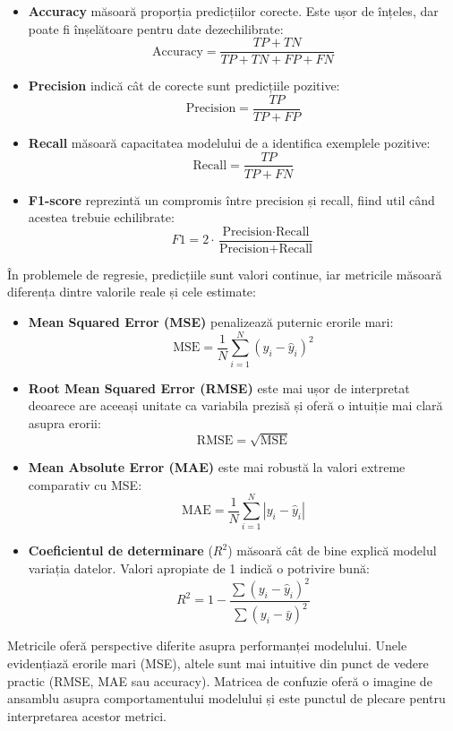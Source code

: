 \begin{itemize}
    \item \textbf{Accuracy} măsoară proporția predicțiilor corecte. Este ușor de înțeles, dar poate fi înșelătoare pentru date dezechilibrate:
    \[
        \text{Accuracy} = \frac{TP + TN}{TP + TN + FP + FN}
    \]

    \item \textbf{Precision} indică cât de corecte sunt predicțiile pozitive:
    \[
        \text{Precision} = \frac{TP}{TP + FP}
    \]

    \item \textbf{Recall} măsoară capacitatea modelului de a identifica exemplele pozitive:
    \[
        \text{Recall} = \frac{TP}{TP + FN}
    \]

    \item \textbf{F1-score} reprezintă un compromis între precision și recall, fiind util când acestea trebuie echilibrate:
    \[
        F1 = 2 \cdot \frac{\text{Precision} \cdot \text{Recall}}{\text{Precision} + \text{Recall}}
    \]
\end{itemize}

În problemele de regresie, predicțiile sunt valori continue, iar metricile măsoară diferența dintre valorile reale și cele estimate:

\begin{itemize}
    \item \textbf{Mean Squared Error (MSE)} penalizează puternic erorile mari:
    \[
        \text{MSE} = \frac{1}{N} \sum_{i=1}^{N} (y_i - \hat{y}_i)^2
    \]

    \item \textbf{Root Mean Squared Error (RMSE)} este mai ușor de interpretat deoarece are aceeași unitate ca variabila prezisă și oferă o intuiție mai clară asupra erorii:
    \[
        \text{RMSE} = \sqrt{\text{MSE}}
    \]

    \item \textbf{Mean Absolute Error (MAE)} este mai robustă la valori extreme comparativ cu MSE:
    \[
        \text{MAE} = \frac{1}{N} \sum_{i=1}^{N} |y_i - \hat{y}_i|
    \]

    \item \textbf{Coeficientul de determinare} (\(R^2\)) măsoară cât de bine explică modelul variația datelor. Valori apropiate de 1 indică o potrivire bună:
    \[
        R^2 = 1 - \frac{\sum (y_i - \hat{y}_i)^2}{\sum (y_i - \bar{y})^2}
    \]
\end{itemize}

Metricile oferă perspective diferite asupra performanței modelului. Unele evidențiază erorile mari (MSE), altele sunt mai intuitive din punct de vedere practic (RMSE, MAE sau accuracy). Matricea de confuzie oferă o imagine de ansamblu asupra comportamentului modelului și este punctul de plecare pentru interpretarea acestor metrici.
